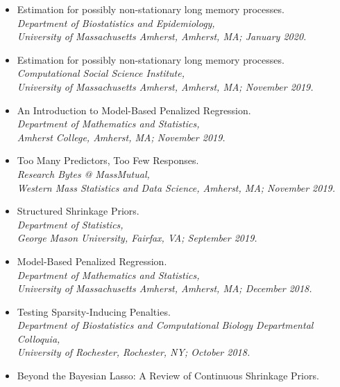 \documentclass[11pt]{article}
\newcommand{\tab}{\hspace*{2em}}
\begin{document}
\begin{itemize}
	\item[] Estimation for possibly non-stationary long memory processes. \\
	\tab \emph{Department of Biostatistics and Epidemiology,}\\ 
	\tab \emph{University of Massachusetts Amherst, Amherst, MA; January 2020.} \vspace{-2mm}
	\item[] Estimation for possibly non-stationary long memory processes. \\
	\tab \emph{Computational Social Science Institute,}\\ 
	\tab \emph{University of Massachusetts Amherst, Amherst, MA; November 2019.} \vspace{-2mm}
	\item[] An Introduction to Model-Based Penalized Regression. \\
	\tab \emph{Department of Mathematics and Statistics,}\\ 
	\tab \emph{Amherst College, Amherst, MA; November 2019.} \vspace{-2mm}
	\item[] Too Many Predictors, Too Few Responses. \\
	\tab \emph{Research Bytes @ MassMutual,}\\ 
	\tab \emph{Western Mass Statistics and Data Science, Amherst, MA; November 2019.} \vspace{-2mm}
	\item[] Structured Shrinkage Priors. \\
	\tab \emph{Department of Statistics,}\\ 
	\tab \emph{George Mason University, Fairfax, VA; September 2019.} \vspace{-2mm}
	\item[] Model-Based Penalized Regression. \\
	\tab \emph{Department of Mathematics and Statistics,}\\ 
	\tab \emph{University of Massachusetts Amherst, Amherst, MA; December 2018.} \vspace{-2mm}
	\item[] Testing Sparsity-Inducing Penalties. \\
	\tab \emph{Department of Biostatistics and Computational Biology Departmental Colloquia,}\\ 
	\tab \emph{University of Rochester, Rochester, NY; October 2018.} \vspace{-2mm}
	\item[] Beyond the Bayesian Lasso: A Review of Continuous Shrinkage Priors. \\

\end{itemize}
\end{document}
